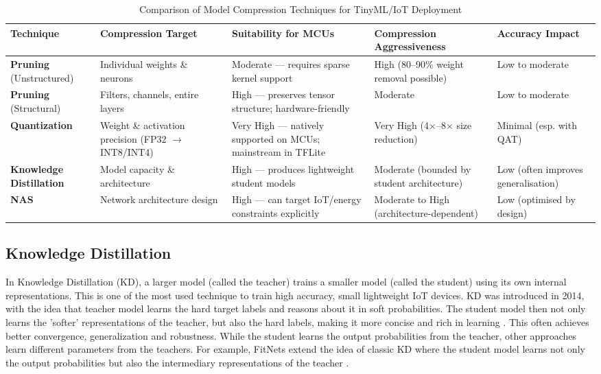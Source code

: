 \documentclass[conference]{IEEEtran}
\begin{document}
	\begin{table}[h]
		\centering
		\caption{Comparison of Model Compression Techniques for TinyML/IoT Deployment}
		\label{tab:compression}
		\renewcommand{\arraystretch}{1.3}
		\begin{tabular}{|p{2.8cm}|p{3cm}|p{2.8cm}|p{3cm}|p{2.5cm}|}
			\hline
			\textbf{Technique} & \textbf{Compression Target} & \textbf{Suitability for MCUs} & \textbf{Compression Aggressiveness} & \textbf{Accuracy Impact} \\
			\hline
			\textbf{Pruning} (Unstructured) & Individual weights \& neurons & Moderate — requires sparse kernel support & High (80--90\% weight removal possible) & Low to moderate \\
			\hline
			\textbf{Pruning} (Structural) & Filters, channels, entire layers & High — preserves tensor structure; hardware-friendly & Moderate & Low to moderate \\
			\hline
			\textbf{Quantization} & Weight \& activation precision (FP32 $\rightarrow$ INT8/INT4) & Very High — natively supported on MCUs; mainstream in TFLite & Very High (4$\times$--8$\times$ size reduction) & Minimal (esp. with QAT) \\
			\hline
			\textbf{Knowledge Distillation} & Model capacity \& architecture & High — produces lightweight student models & Moderate (bounded by student architecture) & Low (often improves generalisation) \\
			\hline
			\textbf{NAS} & Network architecture design & High — can target IoT/energy constraints explicitly & Moderate to High (architecture-dependent) & Low (optimised by design) \\
			\hline
		\end{tabular}
	\end{table}
	
	\subsection{Knowledge Distillation}
	In Knowledge Distillation (KD), a larger model (called the teacher) trains a smaller model (called the student) using its own internal representations. This is one of the most used technique to train high accuracy, small lightweight IoT devices. KD was introduced in 2014, with the idea that teacher model learns the hard target labels and reasons about it in soft probabilities. The student model then not only learns the 'softer' representations of the teacher, but also the hard labels, making it more concise and rich in learning \cite{knowledgedistillation2014}. This often achieves better convergence, generalization and robustness. While the student learns the output probabilities from the teacher, other approaches learn different parameters from the teachers. For example, FitNets extend the idea of classic KD where the student model learns not only the output probabilities but also the intermediary representations of the teacher \cite{fitnets2015}.
	
\end{document}
